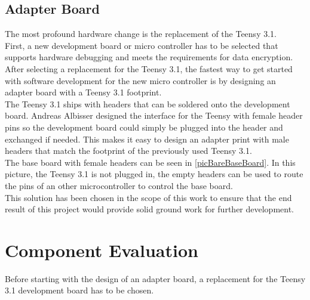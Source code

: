 \subsection{Adapter Board}
The most profound hardware change is the replacement of the Teensy 3.1.\\
First, a new development board or micro controller has to be selected that supports hardware debugging and meets the requirements for data encryption. \\
After selecting a replacement for the Teensy 3.1, the fastest way to get started with software development for the new micro controller is by designing an adapter board with a Teensy 3.1 footprint. \\
The Teensy 3.1 ships with headers that can be soldered onto the development board. Andreas Albisser designed the interface for the Teensy with female header pins so the development board could simply be plugged into the header and exchanged if needed. This makes it easy to design an adapter print with male headers that match the footprint of the previously used Teensy 3.1. \\
The base board with female headers can be seen in \autoref{picBareBaseBoard}. In this picture, the Teensy 3.1 is not plugged in, the empty headers can be used to route the pins of an other microcontroller to control the base board.\\
This solution has been chosen in the scope of this work to ensure that the end result of this project would provide solid ground work for further development.
%
%
%
\section{Component Evaluation}
Before starting with the design of an adapter board, a replacement for the Teensy 3.1 development board has to be chosen. \\
%
